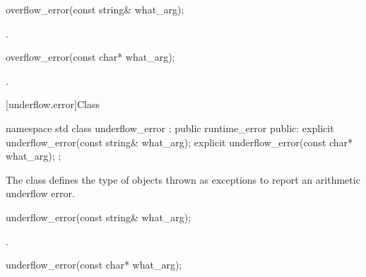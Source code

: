 %
\begin{itemdecl}
overflow_error(const string& what_arg);
\end{itemdecl}

\begin{itemdescr}

\pnum
\ensures
{}.
\end{itemdescr}

%
\begin{itemdecl}
overflow_error(const char* what_arg);
\end{itemdecl}

\begin{itemdescr}

\pnum
\ensures
{}.
\end{itemdescr}

[underflow.error]{Class }

%
\begin{codeblock}
namespace std {
  class underflow_error : public runtime_error {
  public:
    explicit underflow_error(const string& what_arg);
    explicit underflow_error(const char* what_arg);
  };
}
\end{codeblock}

\pnum
The class
defines the type of objects thrown as exceptions to report an arithmetic underflow error.

%
\begin{itemdecl}
underflow_error(const string& what_arg);
\end{itemdecl}

\begin{itemdescr}

\pnum
\ensures
{}.
\end{itemdescr}

%
\begin{itemdecl}
underflow_error(const char* what_arg);
\end{itemdecl}

